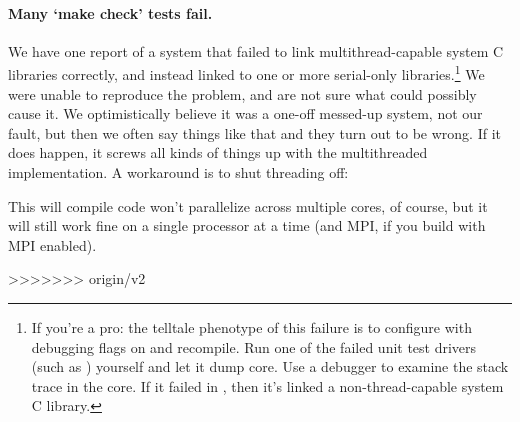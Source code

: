   \vspace{1ex}
  \vspace{1ex}

\paragraph{Many `make check' tests fail.} We have one report of a
system that failed to link multithread-capable system C libraries
correctly, and instead linked to one or more serial-only
libraries.\footnote{If you're a pro: the telltale phenotype of this
  failure is to configure with debugging flags on and recompile. Run
  one of the failed unit test drivers (such as
  ) yourself and let it dump core. Use a
  debugger to examine the stack trace in the core. If it failed in
  , then it's linked a non-thread-capable
  system C library.} We were unable to reproduce the problem, and are
not sure what could possibly cause it. We optimistically believe it
was a one-off messed-up system, not our fault, but then we often say
things like that and they turn out to be wrong. If it does happen, it
screws all kinds of things up with the multithreaded implementation. A
workaround is to shut threading off:

  \vspace{1ex}
  \vspace{1ex}

This will compile code won't parallelize across multiple cores, of
course, but it will still work fine on a single processor at a time
(and MPI, if you build with MPI enabled).

>>>>>>> origin/v2
